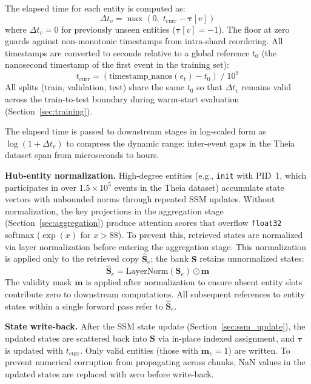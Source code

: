 \documentclass[letterpaper,twocolumn,10pt]{article}
\begin{document}
The elapsed time for each entity is computed as:
\begin{equation}
    \Delta t_v = \max\!\left(0,\; t_{\text{curr}} - \boldsymbol{\tau}[v]\right)
    \label{eq:dt}
\end{equation}
where $\Delta t_v = 0$ for previously unseen entities ($\boldsymbol{\tau}[v] = -1$). The floor at zero guards against non-monotonic timestamps from intra-shard reordering. All timestamps are converted to seconds relative to a global reference $t_0$ (the nanosecond timestamp of the first event in the training set):
\begin{equation}
    t_{\text{curr}} = (\text{timestamp\_nanos}(e_t) - t_0) \;/\; 10^9
    \label{eq:t_curr}
\end{equation}
All splits (train, validation, test) share the same $t_0$ so that $\Delta t_v$ remains valid across the train-to-test boundary during warm-start evaluation (Section~\ref{sec:training}).

The elapsed time is passed to downstream stages in log-scaled form as $\log(1 + \Delta t_v)$ to compress the dynamic range: inter-event gaps in the Theia dataset span from microseconds to hours.

\textbf{Hub-entity normalization.} High-degree entities (e.g., \texttt{init} with PID~1, which participates in over $1.5 \times 10^5$ events in the Theia dataset) accumulate state vectors with unbounded norms through repeated SSM updates. Without normalization, the key projections in the aggregation stage (Section~\ref{sec:aggregation}) produce attention scores that overflow \texttt{float32} softmax ($\exp(x)$ for $x > 88$). To prevent this, retrieved states are normalized via layer normalization before entering the aggregation stage. This normalization is applied only to the retrieved copy $\hat{\mathbf{S}}_e$; the bank $\mathbf{S}$ retains unnormalized states:
\begin{equation}
    \hat{\mathbf{S}}_e = \text{LayerNorm}(\mathbf{S}_e) \odot \mathbf{m}
    \label{eq:state_norm}
\end{equation}
The validity mask $\mathbf{m}$ is applied after normalization to ensure absent entity slots contribute zero to downstream computations. All subsequent references to entity states within a single forward pass refer to $\hat{\mathbf{S}}_e$.

\textbf{State write-back.} After the SSM state update (Section~\ref{sec:ssm_update}), the updated states are scattered back into $\mathbf{S}$ via in-place indexed assignment, and $\boldsymbol{\tau}$ is updated with $t_{\text{curr}}$. Only valid entities (those with $\mathbf{m}_v = 1$) are written. To prevent numerical corruption from propagating across chunks, NaN values in the updated states are replaced with zero before write-back.
\end{document}
